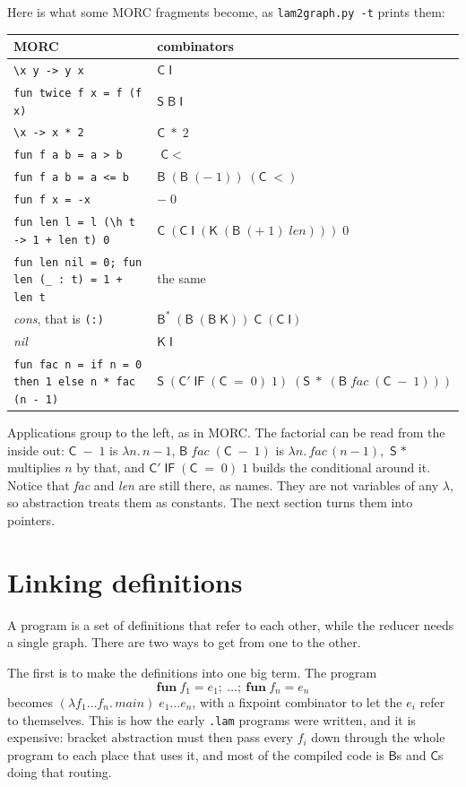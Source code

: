 \documentclass[11pt,a4paper]{article}
\newcommand{\cmb}[1]{\textsf{#1}}
\newcommand{\I}{\cmb{I}}
\newcommand{\K}{\cmb{K}}
\newcommand{\Sc}{\cmb{S}}
\newcommand{\B}{\cmb{B}}
\newcommand{\C}{\cmb{C}}
\newcommand{\Bs}{\cmb{B}^{*}}
\newcommand{\Cp}{\cmb{C}'}
\newcommand{\IF}{\cmb{IF}}
\theoremstyle{definition}
\theoremstyle{plain}
\begin{document}
Here is what some MORC fragments become, as \texttt{lam2graph.py -t} prints
them:
\begin{center}
\small
\begin{tabular}{@{}l l@{}}
\toprule
MORC & combinators\\
\midrule
\verb|\x y -> y x| & $\C\;\I$\\
\verb|fun twice f x = f (f x)| & $\Sc\;\B\;\I$\\
\verb|\x -> x * 2| & $\C\;{*}\;2$\\
\verb|fun f a b = a > b| & $\C\;{<}$\\
\verb|fun f a b = a <= b| & $\B\;(\B\;({-}\;1))\;(\C\;{<})$\\
\verb|fun f x = -x| & ${-}\;0$\\
\verb|fun len l = l (\h t -> 1 + len t) 0| & $\C\;(\C\;\I\;(\K\;(\B\;({+}\;1)\;\mathit{len})))\;0$\\
\verb|fun len nil = 0; fun len (_ : t) = 1 + len t| & the same\\
\textit{cons}, that is \verb|(:)| & $\Bs\;(\B\;(\B\;\K))\;\C\;(\C\;\I)$\\
\textit{nil} & $\K\;\I$\\
\midrule
\verb|fun fac n = if n = 0 then 1 else n * fac (n - 1)| & $\Sc\;(\Cp\;\IF\;(\C\;{=}\;0)\;1)\;(\Sc\;{*}\;(\B\;\mathit{fac}\;(\C\;{-}\;1)))$\\
\bottomrule
\end{tabular}
\end{center}
Applications group to the left, as in MORC. The factorial can be read from
the inside out: $\C\;{-}\;1$ is $\lambda n.\,n-1$, $\B\;\mathit{fac}\;(\C\;{-}\;1)$
is $\lambda n.\,\mathit{fac}\,(n-1)$, $\Sc\;{*}$ multiplies $n$ by that, and
$\Cp\;\IF\;(\C\;{=}\;0)\;1$ builds the conditional around it. Notice that
\textit{fac} and \textit{len} are still there, as names. They are not
variables of any $\lambda$, so abstraction treats them as constants. The next
section turns them into pointers.

\section{Linking definitions}\label{sec:linking}

A program is a set of definitions that refer to each other, while the reducer
needs a single graph. There are two ways to get from one to the other.

The first is to make the definitions into one big term. The program
\[
  \mathbf{fun}\ f_1 = e_1;\ \ldots;\ \mathbf{fun}\ f_n = e_n
\]
becomes $(\lambda f_1\ldots f_n.\,\mathit{main})\;e_1\ldots e_n$, with a
fixpoint combinator to let the $e_i$ refer to themselves. This is how the
early \texttt{.lam} programs were written, and it is expensive: bracket
abstraction must then pass every $f_i$ down through the whole program to each
place that uses it, and most of the compiled code is $\B$s and $\C$s doing
that routing.
\end{document}
